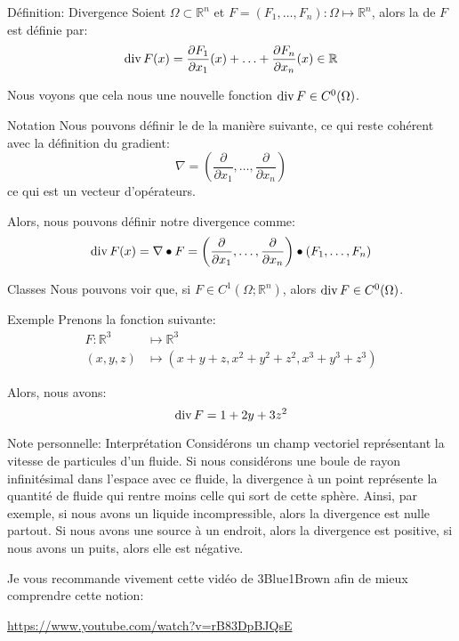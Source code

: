 \documentclass[a4paper]{article}
\begin{document}
\begin{parag}{Définition: Divergence}
    Soient $\Omega \subset \mathbb{R}^n$ et $F = \left(F_1, \ldots, F_n\right): \Omega \mapsto \mathbb{R}^n$, alors la  de $F$ est définie par:
    \[\Div F\left(x\right) = \frac{\partial F_1}{\partial x_1} \left(x\right) + \ldots + \frac{\partial F_n}{\partial x_n} \left(x\right) \in \mathbb{R}\]

    Nous voyons que cela nous une nouvelle fonction $\Div F \in C^0\left(\Omega\right)$.

    \begin{subparag}{Notation}
        Nous pouvons définir le  de la manière suivante, ce qui reste cohérent avec la définition du gradient: 
        \[\nabla = \left(\frac{\partial}{\partial x_1}, \ldots, \frac{\partial }{\partial x_n} \right)\]
        ce qui est un  vecteur d'opérateurs.

        Alors, nous pouvons définir notre divergence comme: 
        \[\Div F\left(x\right) = \nabla \dotprod F = \left(\frac{\partial }{\partial x_1} , \ldots, \frac{\partial }{\partial x_n} \right) \dotprod \left(F_1, \ldots, F_n\right)\]
    \end{subparag}

    \begin{subparag}{Classes}
        Nous pouvons voir que, si $F \in C^1\left(\Omega; \mathbb{R}^n\right)$, alors $\Div F \in C^0\left(\Omega\right)$.
    \end{subparag}
    
    \begin{subparag}{Exemple}
        Prenons la fonction suivante: 
        \[\begin{split}
        F: \mathbb{R}^3 &\longmapsto \mathbb{R}^3 \\
        \left(x, y, z\right) &\longmapsto \left(x + y + z, x^2 + y^2 + z^2, x^3 + y^3 + z^3\right)
        \end{split}\]
        
        Alors, nous avons: 
        \[\operatorname{div} F = 1 + 2y + 3z^2\]
    \end{subparag}

    \begin{subparag}{Note personnelle: Interprétation}
        Considérons un champ vectoriel représentant la vitesse de particules d'un fluide. Si nous considérons une boule de rayon infinitésimal dans l'espace avec ce fluide, la divergence à un point représente la quantité de fluide qui rentre moins celle qui sort de cette sphère. Ainsi, par exemple, si nous avons un liquide incompressible, alors la divergence est nulle partout. Si nous avons une source à un endroit, alors la divergence est positive, si nous avons un puits, alors elle est négative.

        Je vous recommande vivement cette vidéo de 3Blue1Brown afin de mieux comprendre cette notion:
        \begin{center}
            \url{https://www.youtube.com/watch?v=rB83DpBJQsE}
        \end{center}
    \end{subparag}
\end{parag}
\end{document}
